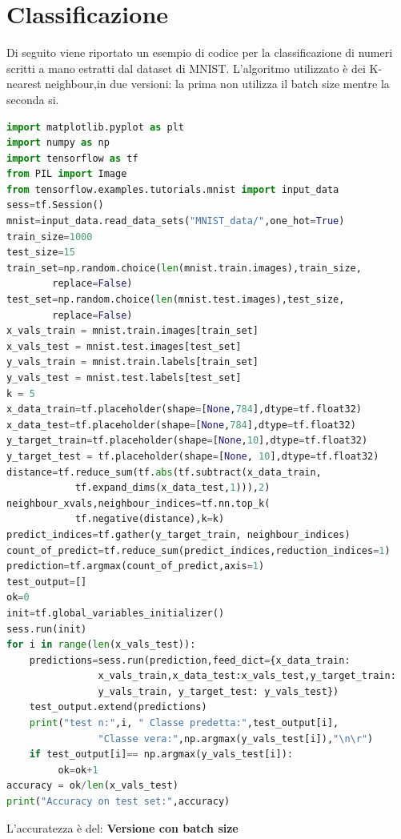 \documentclass[a4paper,12pt]{report}
\begin{document}
\section*{Classificazione}
Di seguito viene riportato un esempio di codice per la classificazione di numeri scritti a mano estratti dal dataset di MNIST. L'algoritmo utilizzato \`{e} dei K-nearest neighbour,in due versioni: la prima non utilizza il batch size mentre la seconda si.\\
\begin{lstlisting}[language={Python},tabsize=2]
import matplotlib.pyplot as plt
import numpy as np
import tensorflow as tf
from PIL import Image
from tensorflow.examples.tutorials.mnist import input_data
sess=tf.Session()
mnist=input_data.read_data_sets("MNIST_data/",one_hot=True)
train_size=1000
test_size=15
train_set=np.random.choice(len(mnist.train.images),train_size,
		replace=False)
test_set=np.random.choice(len(mnist.test.images),test_size,
		replace=False)
x_vals_train = mnist.train.images[train_set]
x_vals_test = mnist.test.images[test_set]
y_vals_train = mnist.train.labels[train_set]
y_vals_test = mnist.test.labels[test_set]
k = 5
x_data_train=tf.placeholder(shape=[None,784],dtype=tf.float32)
x_data_test=tf.placeholder(shape=[None,784],dtype=tf.float32)
y_target_train=tf.placeholder(shape=[None,10],dtype=tf.float32)
y_target_test = tf.placeholder(shape=[None, 10],dtype=tf.float32)
distance=tf.reduce_sum(tf.abs(tf.subtract(x_data_train,
			tf.expand_dims(x_data_test,1))),2)
neighbour_xvals,neighbour_indices=tf.nn.top_k(
			tf.negative(distance),k=k)
predict_indices=tf.gather(y_target_train, neighbour_indices)
count_of_predict=tf.reduce_sum(predict_indices,reduction_indices=1)
prediction=tf.argmax(count_of_predict,axis=1)
test_output=[]
ok=0
init=tf.global_variables_initializer()
sess.run(init)
for i in range(len(x_vals_test)):
    predictions=sess.run(prediction,feed_dict={x_data_train:
				x_vals_train,x_data_test:x_vals_test,y_target_train:
				y_vals_train, y_target_test: y_vals_test})
    test_output.extend(predictions)
    print("test n:",i, " Classe predetta:",test_output[i],
				"Classe vera:",np.argmax(y_vals_test[i]),"\n\r")
    if test_output[i]== np.argmax(y_vals_test[i]):
         ok=ok+1
accuracy = ok/len(x_vals_test)
print("Accuracy on test set:",accuracy)
\end{lstlisting}
L'accuratezza \`{e} del: 
\textbf{Versione con batch size}
\end{document}

